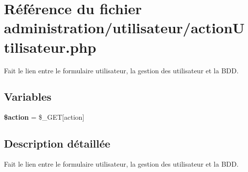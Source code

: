 \hypertarget{actionUtilisateur_8php}{}\section{Référence du fichier administration/utilisateur/action\+Utilisateur.php}
\label{actionUtilisateur_8php}


Fait le lien entre le formulaire utilisateur, la gestion des utilisateur et la B\+DD.  


\subsection*{Variables}
\begin{DoxyCompactItemize}
\item 
\mbox{\label{actionUtilisateur_8php_aa698a3e72116e8e778be0e95d908ee30}} 
{\bfseries \$action} = \$\+\_\+\+G\+ET\mbox{[}\textquotesingle{}action\textquotesingle{}\mbox{]}
\end{DoxyCompactItemize}


\subsection{Description détaillée}
Fait le lien entre le formulaire utilisateur, la gestion des utilisateur et la B\+DD. 

